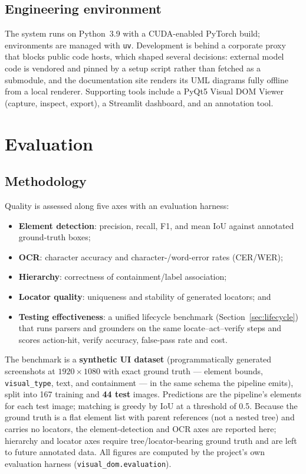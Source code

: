 \documentclass[11pt,a4paper]{article}
\newcommand{\code}[1]{\texttt{#1}}
\begin{document}
\subsection{Engineering environment}
The system runs on Python~3.9 with a CUDA-enabled PyTorch build; environments are
managed with \code{uv}. Development is behind a corporate proxy that blocks public
code hosts, which shaped several decisions: external model code is vendored and
pinned by a setup script rather than fetched as a submodule, and the documentation
site renders its UML diagrams fully offline from a local renderer. Supporting tools
include a PyQt5 Visual DOM Viewer (capture, inspect, export), a Streamlit
dashboard, and an annotation tool.

\section{Evaluation}
\label{sec:eval}

\subsection{Methodology}
Quality is assessed along five axes with an evaluation harness:
\begin{itemize}[leftmargin=1.4em]
  \item \textbf{Element detection}: precision, recall, F1, and mean IoU against
        annotated ground-truth boxes;
  \item \textbf{OCR}: character accuracy and character-/word-error rates (CER/WER);
  \item \textbf{Hierarchy}: correctness of containment/label association;
  \item \textbf{Locator quality}: uniqueness and stability of generated locators; and
  \item \textbf{Testing effectiveness}: a unified lifecycle benchmark
        (Section~\ref{sec:lifecycle}) that runs parsers and grounders on the same
        locate--act--verify steps and scores action-hit, verify accuracy, false-pass
        rate and cost.
\end{itemize}
The benchmark is a \textbf{synthetic UI dataset} (programmatically generated
screenshots at $1920\times1080$ with exact ground truth --- element bounds,
\code{visual\_type}, text, and containment --- in the same schema the pipeline
emits), split into 167 training and \textbf{44 test} images. Predictions are the
pipeline's elements for each test image; matching is greedy by IoU at a
threshold of 0.5. Because the ground truth is a flat element list with parent
references (not a nested tree) and carries no locators, the element-detection and
OCR axes are reported here; hierarchy and locator axes require tree/locator-bearing
ground truth and are left to future annotated data. All figures are computed by the
project's own evaluation harness (\code{visual\_dom.evaluation}).
\end{document}
